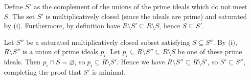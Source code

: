 Define $S'$ as the complement of the unions of the prime ideals which do not
meet $S$. The set $S'$ is multiplicatively closed (since the ideals are prime)
and saturated by (i). Furthermore, by definition have $R \setminus S' \subseteq R\setminus S$,
hence $S \subseteq S'$.

Let $S''$ be a saturated multiplicatively closed subset satisfying $S \subseteq S''$.
By (i), $R\setminus S''$ is a union of prime ideals $p_i$. Let $p_i \subseteq R\setminus S'' \subseteq R\setminus S$
be one of these prime ideals. Then $p_i\cap S = \varnothing$, so $p_i \subseteq R\setminus S'$.
Hence we have $R\setminus S'' \subseteq R\setminus S'$, so
$S' \subseteq S''$, completing the proof that $S'$ is minimal.

